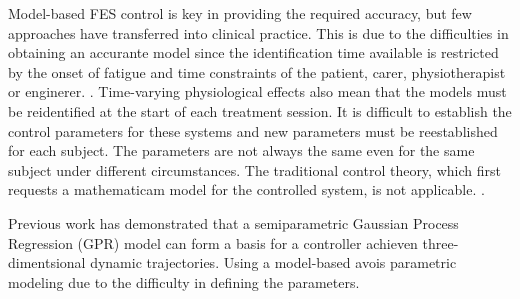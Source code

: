 % 
Model-based FES control is key in providing the required accuracy, but few approaches have transferred into clinical practice. This is due to the difficulties in obtaining an accurante model since the identification time available is restricted by the onset of fatigue and time constraints of the patient, carer, physiotherapist or enginerer. \cite{IOL}.
Time-varying physiological effects also mean that the models must be reidentified at the start of each treatment session. 
It is difficult to establish the control parameters for these systems and new parameters must be reestablished for each subject. The parameters are not always the same even for the same subject under different circumstances. The traditional control theory, which first requests a mathematicam model for the controlled system, is not applicable. \cite{NNPID}.

Previous work has demonstrated that a semiparametric Gaussian Process Regression (GPR) model can form a basis for a controller achieven three-dimentsional dynamic trajectories. Using a model-based \cite{QSC} avois parametric modeling due to the difficulty in defining the parameters. 
